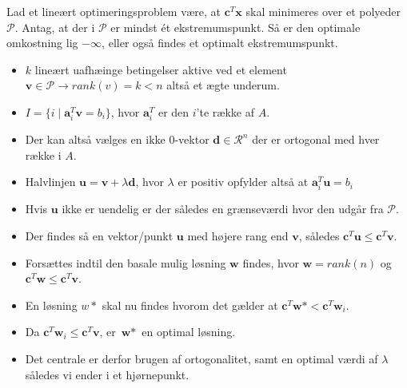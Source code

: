 \begin{frame}
Lad et lineært optimeringsproblem være, at $\textbf{c}^T \textbf{x}$ skal minimeres over et polyeder $\mathcal{P}$. 
Antag, at der i $\mathcal{P}$ er mindst ét ekstremumspunkt. 
Så er den optimale omkostning lig $- \infty$, eller også findes et optimalt ekstremumspunkt.
\end{frame}

\begin{frame}
\begin{itemize}
\item $k$ lineært uafhæinge betingelser aktive ved et element $\textbf{v}\in \mathcal{P} \rightarrow rank(v)=k < n$ altså et ægte underum.
\item $I = \{ i \mid \textbf{a}^T_i \textbf{v} = b_i \}$, hvor $\textbf{a}^T_i$ er den $i$'te række af $A$.
\item  Der kan altså vælges en ikke $0$-vektor $\textbf{d} \in \mathcal{R}^n$ der er ortogonal med hver række i $A$.
\item Halvlinjen $\textbf{u}=\textbf{v}+ \lambda \textbf{d}$, hvor $\lambda$ er positiv opfylder altså at $\textbf{a}^T_i \textbf{u} = b_i$
\end{itemize}
\end{frame}
\begin{frame}
\begin{itemize}
\item Hvis $\textbf{u}$ ikke er uendelig er der således en grænseværdi hvor den udgår fra $\mathcal{P}$.
\item Der findes så en vektor/punkt $\textbf{u}$ med højere rang end $\textbf{v}$, således $\textbf{c}^T \textbf{u} \leq \textbf{c}^T \textbf{v}$.
\item Forsættes indtil den basale mulig løsning $\textbf{w}$ findes, hvor $\textbf{w}=rank(n)$ og $\textbf{c}^T \textbf{w} \leq \textbf{c}^T \textbf{v}$.
\end{itemize}
\end{frame}
\begin{frame}
\begin{itemize}
\item En løsning $w*$ skal nu findes hvorom det gælder at $\textbf{c}^T\textbf{w}*<\textbf{c}^T \textbf{w}_i$.
\item Da $\textbf{c}^T \textbf{w}_i \leq \textbf{c}^T \textbf{v}$, er $\textbf{w}*$ en optimal løsning.
\item Det centrale er derfor brugen af ortogonalitet, samt en optimal værdi af $\lambda$ således vi ender i et hjørnepunkt.
\end{itemize}
\end{frame}

